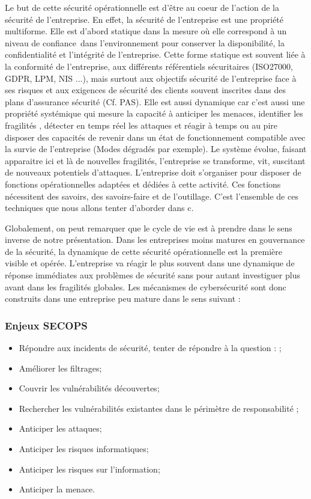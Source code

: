 Le but de cette sécurité opérationnelle est d’être au coeur de l’action de la sécurité de l’entreprise. En effet, la sécurité de l’entreprise est une propriété multiforme. Elle est d’abord statique dans la mesure où elle correspond à un niveau de confiance dans l’environnement pour conserver la disponibilité, la confidentialité et l’intégrité de l’entreprise. Cette forme statique est souvent liée à la conformité de l’entreprise, aux différents référentiels sécuritaires (ISO27000, GDPR, LPM, NIS ...), mais surtout aux objectifs sécurité de l'entreprise face à ses risques et aux exigences de sécurité des clients souvent inscrites dans des plans d’assurance sécurité (Cf. PAS). 
Elle est aussi dynamique car c’est aussi une propriété systémique qui mesure la capacité à anticiper les menaces, identifier les fragilités , détecter en temps réel les attaques et réagir à temps ou au pire disposer des capacités de revenir dans un état de fonctionnement compatible avec la survie de l’entreprise (Modes dégradés par exemple).
Le système évolue, faisant apparaitre ici et là de nouvelles fragilités, l’entreprise se transforme, vit, suscitant de nouveaux potentiels d’attaques. L’entreprise doit s’organiser pour disposer de fonctions opérationnelles adaptées et dédiées à cette activité. Ces fonctions nécessitent des savoirs, des savoirs-faire et de l’outillage. C’est l’ensemble de ces techniques que nous allons tenter d’aborder dans c\edoc.

Globalement, on peut remarquer que le cycle de vie est à prendre dans le sens inverse de notre présentation. Dans les entreprises moins matures en gouvernance de la sécurité, la dynamique de cette sécurité opérationnelle est la première visible et opérée. L'entreprise va réagir le plus souvent dans une dynamique de réponse immédiates aux problèmes de sécurité sans pour autant investiguer plus avant dans les fragilités globales. Les mécanismes de cybersécurité sont donc construits dans une entreprise peu mature dans le sens suivant :

\begin{frame}
\frametitle<presentation>{Enjeux SECOPS}
	\begin{itemize}
		\item Répondre aux incidents de sécurité, tenter de répondre à la question : ; 
		\item Améliorer les filtrages;
		\item Couvrir les vulnérabilités découvertes;
		\item Rechercher les vulnérabilités existantes dans le périmètre de responsabilité ;
		\item Anticiper les attaques;
		\item Anticiper les risques informatiques;
		\item Anticiper les risques sur l'information;
		\item Anticiper la menace.
	\end{itemize}
\end{frame}

